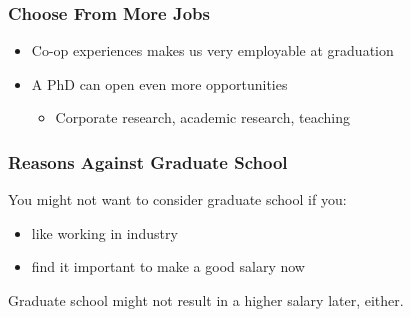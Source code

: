 \documentclass{beamer}
\begin{document}
\begin{frame}
  \frametitle{Choose From More Jobs}
  \begin{itemize}
    \item Co-op experiences makes us very employable at graduation
    \item A PhD can open even more opportunities
      \begin{itemize}
        \item Corporate research, academic research, teaching
      \end{itemize}
  \end{itemize}
\end{frame}

\begin{frame}
  \frametitle{Reasons Against Graduate School}
  You might not want to consider graduate school if you:
  \vspace{2em}

  \begin{itemize}
    \item like working in industry
    \item find it important to make a good salary now
  \end{itemize}
  \vspace{2em}

  Graduate school might not result in a higher salary later, either.
\end{frame}
\end{document}
